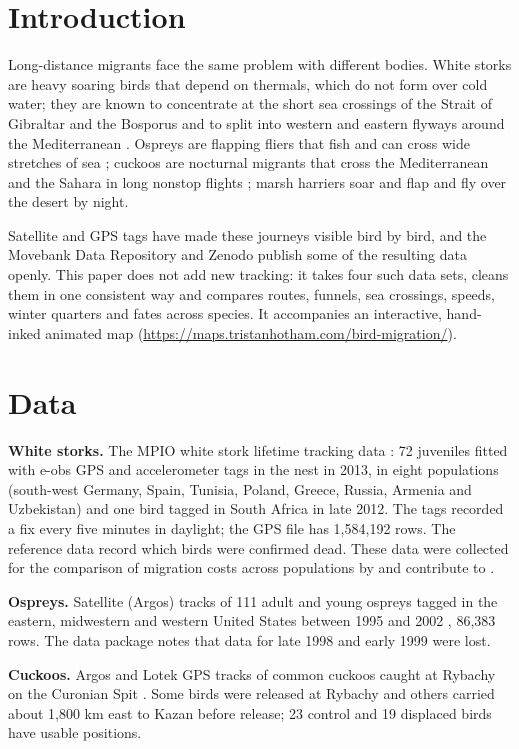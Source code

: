 \documentclass[11pt,a4paper]{article}
\begin{document}
\section{Introduction}
Long-distance migrants face the same problem with different bodies. White storks are heavy soaring birds that depend on thermals, which do not form over cold water; they are known to concentrate at the short sea crossings of the Strait of Gibraltar and the Bosporus and to split into western and eastern flyways around the Mediterranean \citep{flack2016}. Ospreys are flapping fliers that fish and can cross wide stretches of sea \citep{martell2001}; cuckoos are nocturnal migrants that cross the Mediterranean and the Sahara in long nonstop flights \citep{thorup2020}; marsh harriers soar and flap and fly over the desert by night.

Satellite and GPS tags have made these journeys visible bird by bird, and the Movebank Data Repository and Zenodo publish some of the resulting data openly. This paper does not add new tracking: it takes four such data sets, cleans them in one consistent way and compares routes, funnels, sea crossings, speeds, winter quarters and fates across species. It accompanies an interactive, hand-inked animated map (\url{https://maps.tristanhotham.com/bird-migration/}).

\section{Data}
\textbf{White storks.} The MPIO white stork lifetime tracking data \citep{flackdata}: 72 juveniles fitted with e-obs GPS and accelerometer tags in the nest in 2013, in eight populations (south-west Germany, Spain, Tunisia, Poland, Greece, Russia, Armenia and Uzbekistan) and one bird tagged in South Africa in late 2012. The tags recorded a fix every five minutes in daylight; the GPS file has 1,584,192 rows. The reference data record which birds were confirmed dead. These data were collected for the comparison of migration costs across populations by \citet{flack2016} and contribute to \citet{kays2015}.

\textbf{Ospreys.} Satellite (Argos) tracks of 111 adult and young ospreys tagged in the eastern, midwestern and western United States between 1995 and 2002 \citep{martelldata,martell2001}, 86,383 rows. The data package notes that data for late 1998 and early 1999 were lost.

\textbf{Cuckoos.} Argos and Lotek GPS tracks of common cuckoos caught at Rybachy on the Curonian Spit \citep{thorupdata,thorup2020}. Some birds were released at Rybachy and others carried about 1,800 km east to Kazan before release; 23 control and 19 displaced birds have usable positions.
\end{document}
